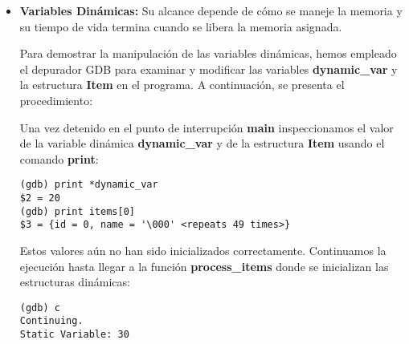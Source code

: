 \documentclass[12pt,a4paper]{article}
\begin{document}
\begin{itemize}
\begin{verbatim}
Breakpoint 2, recursive_function (n=32767, item=0x0) at debug_example.c:16
16      void recursive_function(int n, Item *item) {	
\end{verbatim}
El valor de \textbf{global\_var} sigue siendo 100. Ahora, vamos a modificar su valor en tiempo de ejecución para ver cómo afecta el comportamiento del programa:
\begin{verbatim}
(gdb) set var global_var = 200
(gdb) print global_var 
$4 = 200	
\end{verbatim}
El valor de \textbf{global\_var} ha cambiado a 200. Continuamos la ejecución para ver el impacto de este cambio:
\begin{verbatim}
(gdb) c
Continuing.
Recursion depth: 3, Local Variable: 3, Static Recursive Variable: 50, 
Global Variable: 200, Item ID: 1, Item Name: Item_1

Breakpoint 2, recursive_function (n=0, item=0x0) at debug_example.c:16
16      void recursive_function(int n, Item *item) {	
\end{verbatim}
Podemos observar que el valor de \textbf{global\_var} reflejado en la salida de la función recursiva es ahora 200, lo que confirma que el cambio ha sido aplicado exitosamente en tiempo de ejecución.

\item \textbf{Variables Dinámicas:} Su alcance depende de cómo se maneje la memoria y su tiempo de vida termina cuando se libera la memoria asignada.

Para demostrar la manipulación de las variables dinámicas, hemos empleado el depurador GDB para examinar y modificar las variables \textbf{dynamic\_var} y la estructura \textbf{Item} en el programa. A continuación, se presenta el procedimiento:

Una vez detenido en el punto de interrupción \textbf{main} inspeccionamos el valor de la variable dinámica \textbf{dynamic\_var} y de la estructura \textbf{Item} usando el comando \textbf{print}:
\begin{verbatim}
(gdb) print *dynamic_var 
$2 = 20	
(gdb) print items[0]
$3 = {id = 0, name = '\000' <repeats 49 times>}
\end{verbatim}
Estos valores aún no han sido inicializados correctamente. Continuamos la ejecución hasta llegar a la función \textbf{process\_items} donde se inicializan las estructuras dinámicas:
\begin{verbatim}
(gdb) c
Continuing.
Static Variable: 30


\end{verbatim}
\end{itemize}
\end{document}
